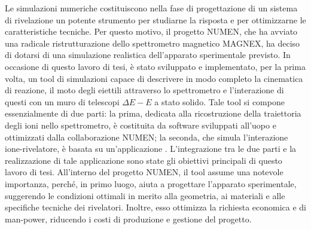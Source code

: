 

Le simulazioni numeriche costituiscono nella fase di progettazione di un sistema di rivelazione un potente strumento per studiarne la risposta e per ottimizzarne le caratteristiche tecniche.
Per questo motivo, il progetto NUMEN, che ha avviato una radicale ristrutturazione dello spettrometro magnetico MAGNEX, ha deciso di dotarsi di una simulazione realistica dell'apparato sperimentale previsto.
In occasione di questo lavoro di tesi, è stato sviluppato e implementato, per la prima volta, un tool di simulazioni capace di descrivere in modo completo la cinematica di reazione, il moto degli eiettili attraverso lo spettrometro e l'interazione di questi con un muro di telescopi $\Delta E - E$ a stato solido.
%
Tale tool si compone essenzialmente di due parti: la prima, dedicata alla ricostruzione della traiettoria degli ioni nello spettrometro, è costituita da software sviluppati all'uopo e ottimizzati dalla collaborazione NUMEN; la seconda, che simula l'interazione ione-rivelatore, è basata su un'applicazione \geant.
L'integrazione tra le due parti e la realizzazione di tale applicazione sono state gli obiettivi principali di questo lavoro di tesi.
All'interno del progetto NUMEN, il tool assume una notevole importanza, perché, in primo luogo, aiuta a progettare l'apparato sperimentale, suggerendo le condizioni ottimali in merito alla geometria, ai materiali e alle specifiche tecniche dei rivelatori. 
Inoltre, esso ottimizza la richiesta economica e di man-power, riducendo i costi di produzione e gestione del progetto.

